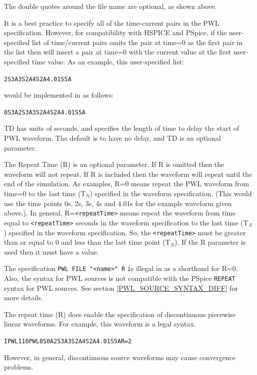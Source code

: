 The double quotes around the file name are optional, as shown above.

It is a best practice to specify all of the time-current pairs in the PWL specification.
However, for compatibility with HSPICE and PSpice, if the user-specified list of 
time/current pairs omits the pair at time=0 as the first pair in the list then \Xyce{} 
will insert a pair at time=0 with the current value at the first user-specified time value.  
As an example, this user-specified list:
\begin{alltt}
2S 3A  3S 2A  4S 2A  4.01S 5A
\end{alltt}
would be implemented in \Xyce{} as follows:  
\begin{alltt} 
0S 3A  2S 3A  3S 2A  4S 2A  4.01S 5A
\end{alltt}

TD has units of seconds, and specifies the length of time to delay
the start of PWL waveform.  The default is to have no delay, and TD is 
an optional parameter.

The Repeat Time (R) is an optional parameter.  If R is omitted then the waveform
will not repeat.  If R is included then the waveform will repeat until the end
of the simulation.  As examples, R=0 means repeat the PWL waveform from time=0
to the last time (T$_N$) specified in the waveform specification. (This would use the
time points 0s, 2s, 3s, 4s and 4.01s for the example waveform given above.).
In general, R=\texttt{<repeatTime>} means repeat the waveform from time equal to
\texttt{<repeatTime>} seconds in the waveform specification to the last time (T$_N$)
specified in the waveform specification. So, the \texttt{<repeatTime>} must be 
greater than or equal to 0 and less than the last time point (T$_N$).
If the R parameter is used then it must have a value.  

The specification \texttt {PWL  FILE "<name>"  R}  \texttt is illegal in \Xyce{} as
a shorthand for R=0.  Also, the \Xyce{} syntax for PWL sources is not compatible
with the PSpice \texttt{REPEAT} syntax for PWL sources.   See section 
\ref{PWL_SOURCE_SYNTAX_DIFF} for more details.

The repeat time (R) does enable the specification of discontinuous piecewise linear
waveforms.  For example, this waveform is a legal \Xyce{} syntax.  
\begin{alltt}
IPWL1 1 0 PWL 0S 0A  2S 3A  3S 2A  4S 2A  4.01S 5A  R=2
\end{alltt}
However, in general, discontinuous source waveforms may cause convergence problems.

